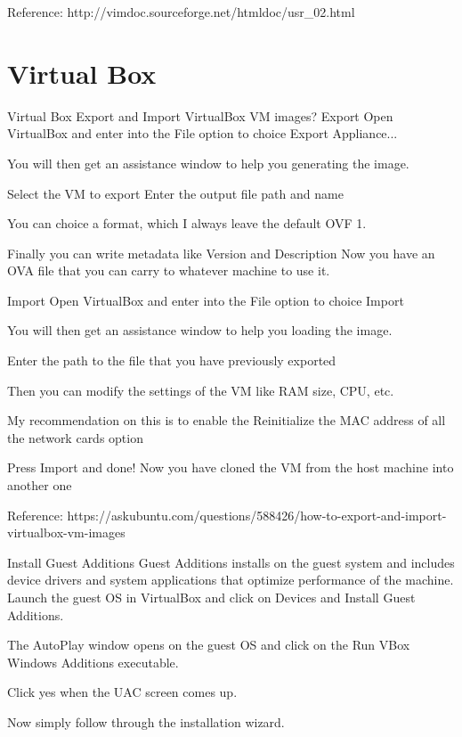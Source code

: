 Reference: http://vimdoc.sourceforge.net/htmldoc/usr_02.html

\section{Virtual Box}

Virtual Box
Export and Import VirtualBox VM images?
Export
Open VirtualBox and enter into the File option to choice Export Appliance...



You will then get an assistance window to help you generating the image.

Select the VM to export
Enter the output file path and name


You can choice a format, which I always leave the default OVF 1.

Finally you can write metadata like Version and Description
Now you have an OVA file that you can carry to whatever machine to use it.

Import
Open VirtualBox and enter into the File option to choice Import

You will then get an assistance window to help you loading the image.

Enter the path to the file that you have previously exported


Then you can modify the settings of the VM like RAM size, CPU, etc.


My recommendation on this is to enable the Reinitialize the MAC address of all the network cards option

Press Import and done!
Now you have cloned the VM from the host machine into another one

Reference: https://askubuntu.com/questions/588426/how-to-export-and-import-virtualbox-vm-images

Install Guest Additions
Guest Additions installs on the guest system and includes device drivers and system applications that optimize performance of the machine. Launch the guest OS in VirtualBox and click on Devices and Install Guest Additions.



The AutoPlay window opens on the guest OS and click on the Run VBox Windows Additions executable.



Click yes when the UAC screen comes up.



Now simply follow through the installation wizard.



